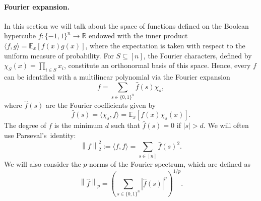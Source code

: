 \documentclass[11pt]{article}
\newcommand{\norm}[1]{\left\|{#1}\right\|}
\theoremstyle{plain}
\theoremstyle{plain}
\theoremstyle{definition}
\theoremstyle{remark}
\theoremstyle{named}
\begin{document}
\paragraph{Fourier expansion.}
In this section we will talk about the space of  functions defined on the Boolean hypercube $f:\{-1,1\}^n\to \mathbb R$ endowed with the inner product $\langle f,g\rangle=\mathbb E_x [f(x)g(x)]$, where the expectation is taken with respect to the uniform measure of probability. For $S\subseteq [n]$, the Fourier characters, defined by $\chi_S(x)=\prod_{i\in  S}x_i$, constitute an orthonormal basis of this space. Hence, every $f$ can be identified with a multilinear polynomial via the Fourier expansion
\begin{equation}\label{eq:FourierExpansion}
    f=\sum_{s\in \{0,1\}^n}\widehat f(s)\chi_s,
\end{equation}
where $\widehat f(s)$ are the Fourier coefficients given by
\begin{equation}\label{eq:FourierExpansion2}
    \widehat f(s)=\langle \chi_s,f\rangle=\mathbb E_{x} [f(x)\chi_s(x)].
\end{equation}
The degree of $f$ is the minimum $d$ such that $\widehat f(s)=0$ if $|s|>d$. We will often use  Parseval's~identity: 
\begin{equation}\label{eq:ParsevalIdentity}
    \norm{f}_2^2:=\langle f,f\rangle =\sum_{s\in [n]}\widehat f(s)^2.
\end{equation}
We will also consider the $p$-norms of the Fourier spectrum, which are defined as $$\norm{\widehat f}_p=\left(\sum_{s\in\{0,1\}^n}|\widehat f(s)|^p\right)^{1/p}.$$
\end{document}
